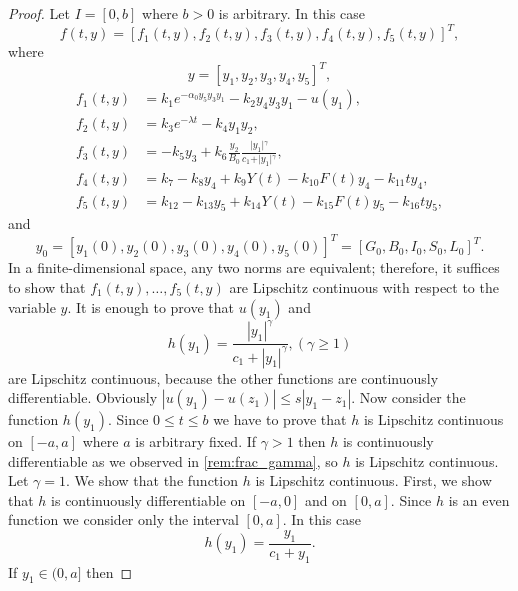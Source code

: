 \documentclass[pdflatex,sn-mathphys-num]{sn-jnl}
\theoremstyle{thmstyleone}
\theoremstyle{thmstyletwo}
\theoremstyle{thmstylethree}
\begin{document}
\begin{proof}
Let $I=[0,b]$ where $b>0$ is arbitrary. In this case 
\begin{equation}
    f(t,y)=[f_1(t,y),f_2(t,y),f_3(t,y),f_4(t,y),f_5(t,y)]^T,
\end{equation}
where 
\begin{equation}
    y=[y_1,y_2,y_3,y_4,y_5]^T,
\end{equation}
\begin{align}
    f_1(t,y) &=k_1 e^{-\alpha_0 y_5 y_3 y_1} - k_2 y_4 y_3 y_1 - u(y_1), \label{eq:f_1} \\
    f_2(t,y) &= k_3 e^{-\lambda t} - k_4 y_1 y_2, \label{eq:f_2} \\
    f_3(t,y) &= -k_5 y_3 + k_6 \frac{y_2}{B_0} \frac{\vert{}y_1\vert{}^\gamma}{c_1 + \vert{}y_1\vert{}^\gamma}, \label{eq:f_3} \\
    f_4(t,y) &= k_7 - k_8 y_4 + k_9 Y(t) - k_{10} F(t) y_4 - k_{11} t y_4, \label{eq:f_4} \\
    f_5(t,y) &= k_{12} - k_{13} y_5 + k_{14} Y(t) - k_{15} F(t) y_5 - k_{16} t y_5, \label{eq:f_5}
\end{align}
and
\begin{equation*}
    y_0=[y_1(0),y_2(0),y_3(0),y_4(0),y_5(0)]^T=[G_0,B_0,I_0,S_0,L_0]^T.
\end{equation*}
In a finite-dimensional space, any two norms are equivalent; therefore, it suffices to show that 
$f_1(t,y),\ldots,f_5(t,y)$ are Lipschitz continuous with respect to the variable $y$. It is enough 
to prove that $u(y_1)$ and 
\begin{equation}
    h(y_1)=\frac{|y_1|^{\gamma}}{c_1+|y_1|^{\gamma}}, (\gamma \geq 1)
\end{equation}
are Lipschitz continuous, because the other functions are continuously differentiable. 
Obviously $|u(y_1)-u(z_1)|\leq s|y_1-z_1|$. Now consider the function 
$h(y_1)$. Since $0\leq t\leq b$ we have to prove that $h$ is Lipschitz continuous on $[-a,a]$ where 
$a$ is arbitrary fixed. If $\gamma>1$ then $h$ is continuously differentiable as we observed in 
 \autoref{rem:frac_gamma}, so $h$ is Lipschitz continuous. Let $\gamma=1$. We show that the function $h$ 
 is Lipschitz continuous. First, we show that $h$ is continuously differentiable on $[-a,0]$ and on 
 $[0,a]$. Since $h$ is an even function we consider only the interval $[0,a]$. In this case
 \begin{equation}
    h(y_1)=\frac{y_1}{c_1+y_1}.
\end{equation}
If $y_1\in (0,a]$ then 

\end{proof}
\end{document}
